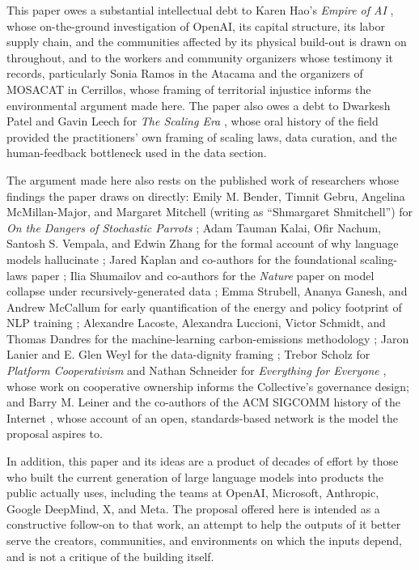 \documentclass[10pt,a4paper,twocolumn]{article}
\begin{document}
This paper owes a substantial intellectual debt to Karen Hao's \emph{Empire of AI} \citep{hao2025empire}, whose on-the-ground investigation of OpenAI, its capital structure, its labor supply chain, and the communities affected by its physical build-out is drawn on throughout, and to the workers and community organizers whose testimony it records, particularly Sonia Ramos in the Atacama and the organizers of MOSACAT in Cerrillos, whose framing of territorial injustice informs the environmental argument made here. The paper also owes a debt to Dwarkesh Patel and Gavin Leech for \emph{The Scaling Era} \citep{patel2025scaling}, whose oral history of the field provided the practitioners' own framing of scaling laws, data curation, and the human-feedback bottleneck used in the data section.

The argument made here also rests on the published work of researchers whose findings the paper draws on directly: Emily M. Bender, Timnit Gebru, Angelina McMillan-Major, and Margaret Mitchell (writing as ``Shmargaret Shmitchell'') for \emph{On the Dangers of Stochastic Parrots} \citep{bender2021parrots}; Adam Tauman Kalai, Ofir Nachum, Santosh S. Vempala, and Edwin Zhang for the formal account of why language models hallucinate \citep{kalai2025whyhallucinate}; Jared Kaplan and co-authors for the foundational scaling-laws paper \citep{kaplan2020scaling}; Ilia Shumailov and co-authors for the \emph{Nature} paper on model collapse under recursively-generated data \citep{shumailov2024modelcollapse}; Emma Strubell, Ananya Ganesh, and Andrew McCallum for early quantification of the energy and policy footprint of NLP training \citep{strubell2019energy}; Alexandre Lacoste, Alexandra Luccioni, Victor Schmidt, and Thomas Dandres for the machine-learning carbon-emissions methodology \citep{lacoste2019mlco2}; Jaron Lanier and E. Glen Weyl for the data-dignity framing \citep{lanier2018dignity}; Trebor Scholz for \emph{Platform Cooperativism} \citep{scholz2016platform} and Nathan Schneider for \emph{Everything for Everyone} \citep{schneider2018everything}, whose work on cooperative ownership informs the Collective's governance design; and Barry M. Leiner and the co-authors of the ACM SIGCOMM history of the Internet \citep{leiner2009history}, whose account of an open, standards-based network is the model the proposal aspires to.

In addition, this paper and its ideas are a product of decades of effort by those who built the current generation of large language models into products the public actually uses, including the teams at OpenAI, Microsoft, Anthropic, Google DeepMind, X, and Meta. The proposal offered here is intended as a constructive follow-on to that work, an attempt to help the outputs of it better serve the creators, communities, and environments on which the inputs depend, and is not a critique of the building itself.
\end{document}
